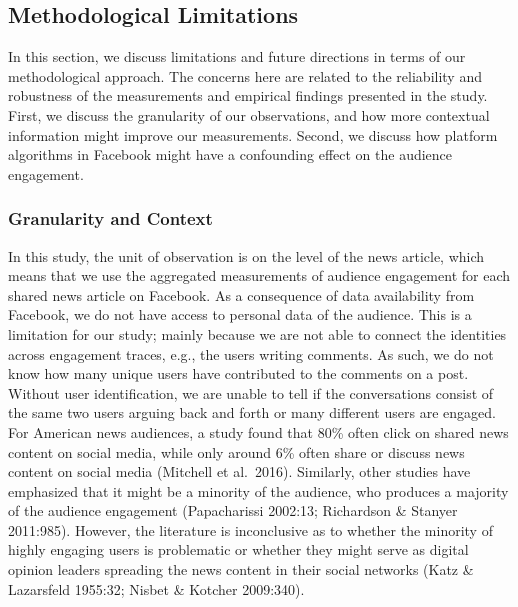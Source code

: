 \documentclass[
]{article}
\begin{document}
\hypertarget{methodological-limitations}{%
\subsection{Methodological
Limitations}\label{methodological-limitations}}

In this section, we discuss limitations and future directions in terms
of our methodological approach. The concerns here are related to the
reliability and robustness of the measurements and empirical findings
presented in the study. First, we discuss the granularity of our
observations, and how more contextual information might improve our
measurements. Second, we discuss how platform algorithms in Facebook
might have a confounding effect on the audience engagement.

\hypertarget{granularity-and-context}{%
\subsubsection{Granularity and Context}\label{granularity-and-context}}

\noindent In this study, the unit of observation is on the level of the
news article, which means that we use the aggregated measurements of
audience engagement for each shared news article on Facebook. As a
consequence of data availability from Facebook, we do not have access to
personal data of the audience. This is a limitation for our study;
mainly because we are not able to connect the identities across
engagement traces, e.g., the users writing comments. As such, we do not
know how many unique users have contributed to the comments on a post.
Without user identification, we are unable to tell if the conversations
consist of the same two users arguing back and forth or many different
users are engaged. For American news audiences, a study found that 80\%
often click on shared news content on social media, while only around
6\% often share or discuss news content on social media (Mitchell et
al.~2016). Similarly, other studies have emphasized that it might be a
minority of the audience, who produces a majority of the audience
engagement (Papacharissi 2002:13; Richardson \& Stanyer 2011:985).
However, the literature is inconclusive as to whether the minority of
highly engaging users is problematic or whether they might serve as
digital opinion leaders spreading the news content in their social
networks (Katz \& Lazarsfeld 1955:32; Nisbet \& Kotcher 2009:340).
\end{document}
